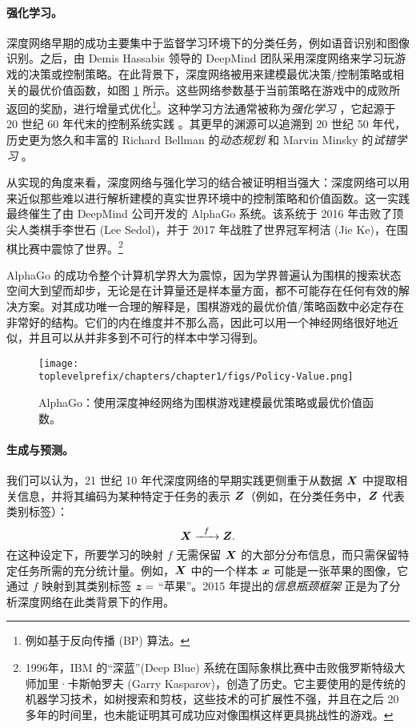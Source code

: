 \documentclass[../../book-main.tex]{subfiles}
\begin{document}
\paragraph{强化学习。}

深度网络早期的成功主要集中于监督学习环境下的分类任务，例如语音识别和图像识别。之后，由 Demis Hassabis 领导的 DeepMind 团队采用深度网络来学习玩游戏的决策或控制策略。在此背景下，深度网络被用来建模最优决策/控制策略或相关的最优价值函数，如图 \ref{fig:Alpha-Go} 所示。这些网络参数基于当前策略在游戏中的成败所返回的奖励，进行增量式优化\footnote{例如基于反向传播 (BP) 算法。}。这种学习方法通常被称为{\em 强化学习} \cite{Sutton-Barto}，它起源于 20 世纪 60 年代末的控制系统实践 \cite{Waltz1965AHA,Mendel1970ReinforcementlearningCA}。其更早的渊源可以追溯到 20 世纪 50 年代，历史更为悠久和丰富的 Richard Bellman 的{\em 动态规划} \cite{Bellman-DP} 和 Marvin Minsky 的{\em 试错学习} \cite{Minsky-1954}。

从实现的角度来看，深度网络与强化学习的结合被证明相当强大：深度网络可以用来近似那些难以进行解析建模的真实世界环境中的控制策略和价值函数。这一实践最终催生了由 DeepMind 公司开发的 AlphaGo 系统。该系统于 2016 年击败了顶尖人类棋手李世石 (Lee Sedol)，并于 2017 年战胜了世界冠军柯洁 (Jie Ke)，在围棋比赛中震惊了世界。\footnote{1996年，IBM 的“深蓝”(Deep Blue) 系统在国际象棋比赛中击败俄罗斯特级大师加里·卡斯帕罗夫 (Garry Kasparov)，创造了历史。它主要使用的是传统的机器学习技术，如树搜索和剪枝，这些技术的可扩展性不强，并且在之后 20 多年的时间里，也未能证明其可成功应对像围棋这样更具挑战性的游戏。}

AlphaGo 的成功令整个计算机学界大为震惊，因为学界普遍认为围棋的搜索状态空间大到望而却步，无论是在计算量还是样本量方面，都不可能存在任何有效的解决方案。对其成功唯一合理的解释是，围棋游戏的最优价值/策略函数中必定存在非常好的结构。它们的内在维度并不那么高，因此可以用一个神经网络很好地近似，并且可以从并非多到不可行的样本中学习得到。

\begin{figure}
    \centering
    \texttt{[image: \\toplevelprefix/chapters/chapter1/figs/Policy-Value.png]}
    \caption{AlphaGo：使用深度神经网络为围棋游戏建模最优策略或最优价值函数。}
    \label{fig:Alpha-Go}
\end{figure}

\paragraph{生成与预测。}
我们可以认为，21 世纪 10 年代深度网络的早期实践更侧重于从数据 $\bm{X}$ 中提取相关信息，并将其编码为某种特定于任务的表示 $\bm{Z}$（例如，在分类任务中，$\bm{Z}$ 代表类别标签）：
\begin{equation}
    \bm{X}   \xrightarrow{\hspace{2mm} f \hspace{2mm}} \bm{Z}.
       \label{eqn:encoding-deep-networks}
\end{equation}
在这种设定下，所要学习的映射 $f$ 无需保留 $\bm{X}$ 的大部分分布信息，而只需保留特定任务所需的充分统计量。例如，$\bm{X}$ 中的一个样本 $\bm{x}$ 可能是一张苹果的图像，它通过 $f$ 映射到其类别标签 $\bm{z} =$ “苹果”。2015 年提出的{\em 信息瓶颈框架} \cite{Tishby-ITW2015} 正是为了分析深度网络在此类背景下的作用。
 
\end{document}

